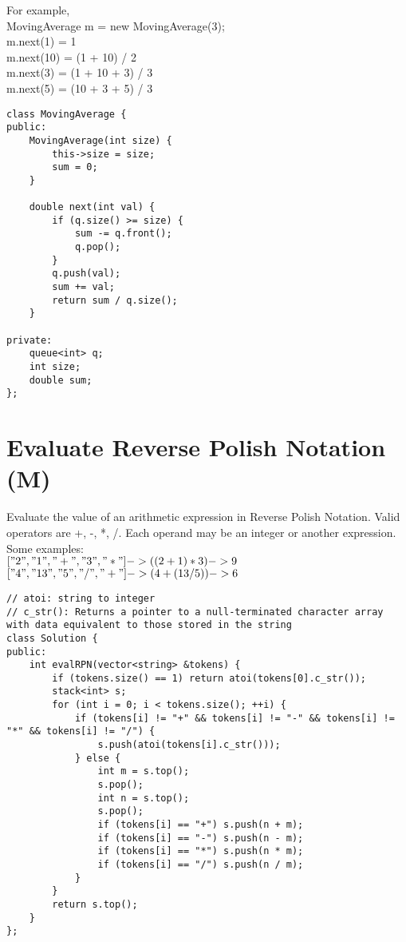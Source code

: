 For example,\\
MovingAverage m = new MovingAverage(3);\\
m.next(1) = 1\\
m.next(10) = (1 + 10) / 2\\
m.next(3) = (1 + 10 + 3) / 3\\
m.next(5) = (10 + 3 + 5) / 3 \\

\begin{lstlisting}
class MovingAverage {
public:
    MovingAverage(int size) {
        this->size = size;
        sum = 0;
    }
    
    double next(int val) {
        if (q.size() >= size) {	
            sum -= q.front();
            q.pop();
        }
        q.push(val);
        sum += val;
        return sum / q.size();
    }
    
private:
    queue<int> q;
    int size;
    double sum;
};
\end{lstlisting}


\section{Evaluate Reverse Polish Notation (M)}
Evaluate the value of an arithmetic expression in Reverse Polish Notation. Valid operators are +, -, *, /. Each operand may be an integer or another expression.\\

Some examples:\\
  $["2", "1", "+", "3", "*"] -> ((2 + 1) * 3) -> 9$ \\
  $["4", "13", "5", "/", "+"] -> (4 + (13 / 5)) -> 6$ \\

\begin{lstlisting}
// atoi: string to integer
// c_str(): Returns a pointer to a null-terminated character array with data equivalent to those stored in the string
class Solution {
public:
    int evalRPN(vector<string> &tokens) {
        if (tokens.size() == 1) return atoi(tokens[0].c_str());
        stack<int> s;
        for (int i = 0; i < tokens.size(); ++i) {
            if (tokens[i] != "+" && tokens[i] != "-" && tokens[i] != "*" && tokens[i] != "/") {
                s.push(atoi(tokens[i].c_str()));
            } else {
                int m = s.top();
                s.pop();
                int n = s.top();
                s.pop();
                if (tokens[i] == "+") s.push(n + m);
                if (tokens[i] == "-") s.push(n - m);
                if (tokens[i] == "*") s.push(n * m);
                if (tokens[i] == "/") s.push(n / m);
            }
        }
        return s.top();
    }
};
\end{lstlisting}

